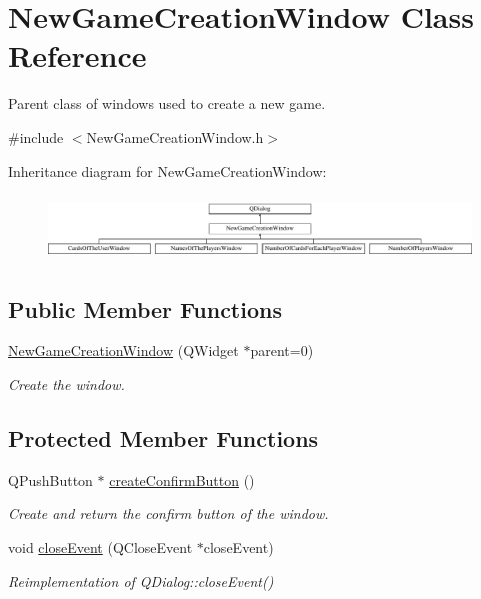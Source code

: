\hypertarget{classNewGameCreationWindow}{}\section{New\+Game\+Creation\+Window Class Reference}
\label{classNewGameCreationWindow}


Parent class of windows used to create a new game.  




{\ttfamily \#include $<$New\+Game\+Creation\+Window.\+h$>$}

Inheritance diagram for New\+Game\+Creation\+Window\+:\begin{figure}[H]
\begin{center}
\leavevmode
\includegraphics[height=1.735537cm]{classNewGameCreationWindow}
\end{center}
\end{figure}
\subsection*{Public Member Functions}
\begin{DoxyCompactItemize}
\item 
\hyperlink{classNewGameCreationWindow_a1b8cd9166289a086a951c2ee9d6bfebe}{New\+Game\+Creation\+Window} (Q\+Widget $\ast$parent=0)
\begin{DoxyCompactList}\small\item\em Create the window. \end{DoxyCompactList}\end{DoxyCompactItemize}
\subsection*{Protected Member Functions}
\begin{DoxyCompactItemize}
\item 
Q\+Push\+Button $\ast$ \hyperlink{classNewGameCreationWindow_aaa0b36302cf67c363da723e64c92c777}{create\+Confirm\+Button} ()
\begin{DoxyCompactList}\small\item\em Create and return the confirm button of the window. \end{DoxyCompactList}\item 
void \hyperlink{classNewGameCreationWindow_ad96277fa809e77e33ade1a93fc4af5d7}{close\+Event} (Q\+Close\+Event $\ast$close\+Event)
\begin{DoxyCompactList}\small\item\em Reimplementation of Q\+Dialog\+::close\+Event() \end{DoxyCompactList}\end{DoxyCompactItemize}

